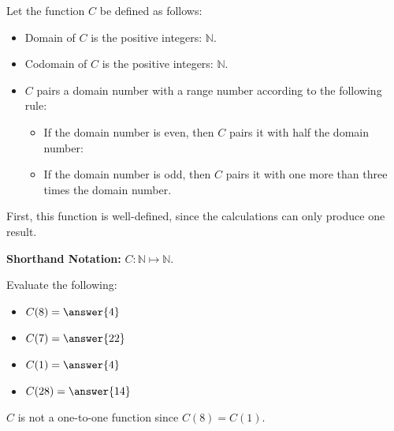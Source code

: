 \documentclass{ximera}
\begin{document}
\begin{example}  

Let the function $C$ be defined as follows:


\begin{itemize}
\item Domain of $C$ is the positive integers: $\mathbb{N}$.
\item Codomain of $C$ is the positive integers: $\mathbb{N}$.
\item $C$ pairs a domain number with a range number according to the following rule:
	\begin{itemize}
			\item If the domain number is even, then $C$ pairs it with half the domain number:
			\item If the domain number is odd, then $C$ pairs it with one more than three times the domain number.
	\end{itemize}
\end{itemize}


First, this function is well-defined, since the calculations can only produce one result.


\textbf{Shorthand Notation: } $C: \mathbb{N} \mapsto \mathbb{N}$.

\begin{question}
Evaluate the following:

\begin{itemize}
	\item $C(8) = \answer{4}$
	\item $C(7) = \answer{22}$
	\item $C(1) = \answer{4}$
	\item $C(28) = \answer{14}$
\end{itemize}

\end{question}



$C$ is not a one-to-one function since $C(8) = C(1)$.


\end{example}
\end{document}
